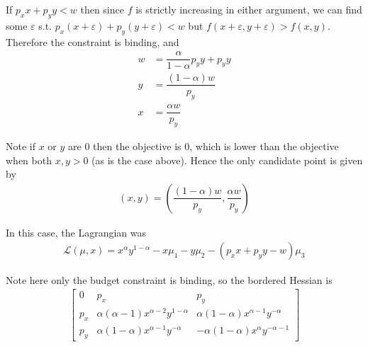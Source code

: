\documentclass{article}
\begin{document}
If $p_x x + p_y y < w$ then since $f$ is strictly increasing in either argument, we can find some $\varepsilon$ s.t. $p_x (x + \varepsilon) + p_y (y + \varepsilon) < w$ but $f(x + \varepsilon, y + \varepsilon) > f(x, y)$. Therefore the constraint is binding, and
\begin{align*}
  w
  &
  =
  \dfrac{\alpha}{1 - \alpha} p_y y + p_y y
  \\
  y
  &
  =
  \dfrac{(1 - \alpha) w}{p_y}
  \\
  x
  &
  =
  \dfrac{\alpha w}{p_y}
\end{align*}

Note if $x$ or $y$ are $0$ then the objective is $0$, which is lower than the objective when both $x, y > 0$ (as is the case above). Hence the only candidate point is given by
\begin{align*}
  (x, y)
  =
  \left(
  \dfrac{(1 - \alpha) w}{p_y}, \dfrac{\alpha w}{p_y}
  \right)
\end{align*}

In this case, the Lagrangian was
\begin{align*}
  \mathcal{L}(\mu, x)
  =
  x^\alpha y^{1 - \alpha}
  -
  x \mu_1
  -
  y \mu_2
  -
  (p_x x + p_y y - w) \mu_3
\end{align*}

Note here only the budget constraint is binding, so the bordered Hessian is
\begin{align*}
  \begin{bmatrix}
    0    & p_x & p_y \\
    p_x  & \alpha (\alpha - 1) x^{\alpha - 2} y^{1 - \alpha} & \alpha (1 - \alpha) x^{\alpha - 1} y^{- \alpha} \\
    p_y  & \alpha (1 - \alpha) x^{\alpha - 1} y^{- \alpha} & - \alpha (1 - \alpha) x^{\alpha} y^{-\alpha - 1}
  \end{bmatrix}
\end{align*}
\end{document}
